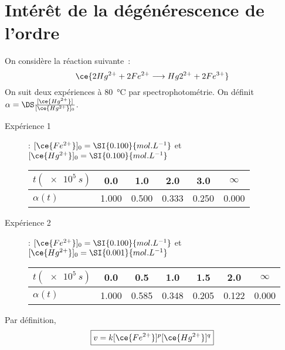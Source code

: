 \documentclass[a4paper, 11pt]{book}
\begin{document}
\section{Intérêt de la dégénérescence de l'ordre}
On considère la réaction suivante~:
\[\ce{2Hg^{2+} + 2Fe^{2+} \longrightarrow Hg2^{2+} + 2Fe^{3+}}\]
On suit deux expériences à \SI{80}{\degreeCelsius} par spectrophotométrie. On
définit $\alpha = \DS \frac{[\ce{Hg^{2+}}]}{[\ce{Hg^{2+}}]_0}$.
\begin{description}
	\item[Expérience 1] : $[\ce{Fe^{2+}}]_0 = \SI{0.100}{mol.L^{-1}}$ et
		$[\ce{Hg^{2+}}]_0 = \SI{0.100}{mol.L^{-1}}$
		\begin{center}
			\begin{tabular}{lccccc}
				\toprule
				$t (\SI{e5}{s})$ &
				\num{0.0}        & \num{1.0}   & \num{2.0}   & \num{3.0}   & $\infty$ \\
				\midrule
				$\alpha(t)$      &
				\num{1.000}      & \num{0.500} & \num{0.333} & \num{0.250} &
				\num{0.000}                                                           \\
				\bottomrule
			\end{tabular}
		\end{center}
	\item[Expérience 2] : $[\ce{Fe^{2+}}]_0 = \SI{0.100}{mol.L^{-1}}$ et
		$[\ce{Hg^{2+}}]_0 = \SI{0.001}{mol.L^{-1}}$
		\begin{center}
			\begin{tabular}{lcccccc}
				\toprule
				$t (\SI{e5}{s})$ &
				\num{0.0}        & \num{0.5}   & \num{1.0}   & \num{1.5}   & \num{2.0} &
				$\infty$                                                                 \\
				\midrule
				$\alpha(t)$      &
				\num{1.000}      & \num{0.585} & \num{0.348} & \num{0.205} &
				\num{0.122}      & \num{0.000}                                           \\
				\bottomrule
			\end{tabular}
		\end{center}
\end{description}

{
Par définition,
\[\boxed{v = k[\ce{Fe^{2+}}]^p[\ce{Hg^{2+}}]^q}\]
}

\end{document}

